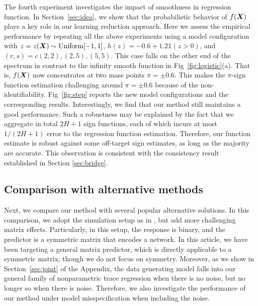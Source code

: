 \documentclass[aos]{imsart}
\theoremstyle{definition}
\begin{document}
The fourth experiment investigates the impact of smoothness in regression function. In Section~\ref{sec:idea}, we show that the probabilistic behavior of $f(\bm X)$ plays a key role in our learning reduction approach. Here we assess the empirical performance by repeating all the above experiments using a model configuration with $z=z(\bm X)\sim \text{Uniform}[-1,1]$, $h(z)=-0.6+1.2\mathds{1}(z>0)$, and $(r,s)=c(2,2),(2,5),(5,5)$. This case falls on the other end of the spectrum in contrast to the infinity smooth function in Fig~\ref{fig:logistic}(a). That is, $f(\bm X)$ now concentrates at two mass points $\pi=\pm 0.6$. This makes the $\pi$-sign function estimation challenging around $\pi=\pm 0.6$ because of the non-identifiability. Fig~\ref{fig:step} reports the new model configurations and the corresponding results. Interestingly, we find that our method still maintains a good performance. Such a robustness may be explained by the fact that we aggregate in total $2H+1$ sign functions, each of which incurs at most $1/(2H+1)$ error to the regression function estimation. Therefore, our function estimate is robust against some off-target sign estimates, as long as the majority are accurate. This observation is consistent with the consistency result established in Section \ref{sec:bridge}.



\subsection{Comparison with alternative methods}
\label{sec:comparison}

Next, we compare our method with several popular alternative solutions. In this comparison, we adopt the simulation setup as in \cite{relion2019network}, but add more challenging matrix effects. Particularly, in this setup, the response is binary, and the predictor is a symmetric matrix that encodes a network. In this article, we have been targeting a general matrix predictor, which is directly applicable to a symmetric matrix, though we do not focus on symmetry. Moreover, as we show in Section~\ref{sec:joint} of the Appendix, the data generating model falls into our general family of nonparametric trace regression when there is no noise, but no longer so when there is noise. Therefore, we also investigate the performance of our method under model misspecification when including the noise. 
\end{document}
